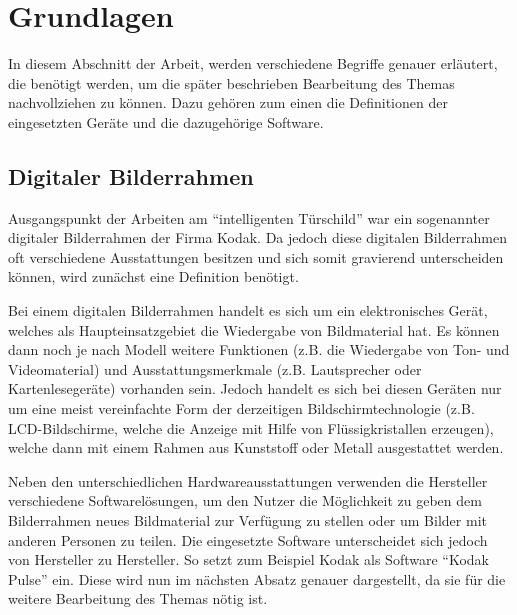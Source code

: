 \chapter{ Grundlagen }\label{chap:Grundlagen}
\vspace*{-3cm}
\begin{flushleft}

In diesem Abschnitt der Arbeit, werden verschiedene Begriffe genauer erläutert, die benötigt werden, um die später beschrieben Bearbeitung
des Themas nachvollziehen zu können. Dazu gehören zum einen die Definitionen der eingesetzten Geräte und die dazugehörige Software.

\section{Digitaler Bilderrahmen}
Ausgangspunkt der Arbeiten am ``intelligenten Türschild'' war ein sogenannter digitaler Bilderrahmen der Firma Kodak. Da jedoch diese digitalen Bilderrahmen oft verschiedene Ausstattungen besitzen und sich somit gravierend unterscheiden können, wird zunächst eine Definition benötigt.

Bei einem digitalen Bilderrahmen handelt es sich um ein elektronisches Gerät, welches als Haupteinsatzgebiet die Wiedergabe von Bildmaterial hat. Es können dann noch je nach Modell weitere Funktionen (z.B. die Wiedergabe von Ton- und Videomaterial) und Ausstattungsmerkmale (z.B. Lautsprecher oder Kartenlesegeräte) vorhanden sein. Jedoch handelt es sich bei diesen Geräten nur um eine meist vereinfachte Form der derzeitigen Bildschirmtechnologie (z.B. LCD-Bildschirme, welche die Anzeige mit Hilfe von Flüssigkristallen erzeugen), welche dann mit einem Rahmen aus Kunststoff oder Metall ausgestattet werden.

Neben den unterschiedlichen Hardwareausstattungen verwenden die Hersteller verschiedene Softwarelösungen, um den Nutzer die Möglichkeit zu geben dem Bilderrahmen neues Bildmaterial zur Verfügung zu stellen oder um Bilder mit anderen Personen zu teilen. Die eingesetzte Software unterscheidet sich jedoch von Hersteller zu Hersteller. So setzt zum Beispiel Kodak als Software ``Kodak Pulse'' ein. Diese wird nun im nächsten Absatz genauer dargestellt, da sie für die weitere Bearbeitung des Themas nötig ist.


\end{flushleft}
